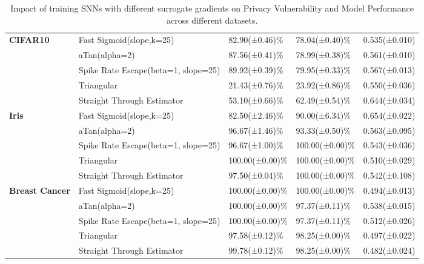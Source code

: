 \begin{table*}[htbp]
\begin{tabular}{p{2cm} p{4cm} p{1.5cm} p{1.5cm} p{1.5cm}}
\midrule
\textbf{CIFAR10} & Fast Sigmoid(slope,k=25) & 82.90(±0.46)\% & 78.04(±0.40)\% & 0.535(±0.010) \\
 & aTan(alpha=2) & 87.56(±0.41)\% & 78.99(±0.38)\% & 0.561(±0.010) \\
 & Spike Rate Escape(beta=1, slope=25) & 89.92(±0.39)\% & 79.95(±0.33)\% & 0.567(±0.013) \\
 & Triangular & 21.43(±0.76)\% & 23.92(±0.86)\% & 0.550(±0.036) \\
 & Straight Through Estimator & 53.10(±0.66)\% & 62.49(±0.54)\% & 0.644(±0.034) \\
\midrule
\textbf{Iris} & Fast Sigmoid(slope,k=25) & 82.50(±2.46)\% & 90.00(±6.34)\% & 0.654(±0.022) \\ 
 & aTan(alpha=2) & 96.67(±1.46)\% & 93.33(±0.50)\% & 0.563(±0.095) \\
 & Spike Rate Escape(beta=1, slope=25) & 96.67(±1.00)\% & 100.00(±0.00)\% & 0.543(±0.036) \\
 & Triangular & 100.00(±0.00)\% & 100.00(±0.00)\% & 0.510(±0.029) \\
 & Straight Through Estimator & 97.50(±0.04)\% & 100.00(±0.00)\% & 0.542(±0.108) \\
\midrule
\textbf{Breast Cancer} & Fast Sigmoid(slope,k=25) & 100.00(±0.00)\% & 100.00(±0.00)\% & 0.494(±0.013) \\
 & aTan(alpha=2) & 100.00(±0.00)\% & 97.37(±0.11)\% & 0.538(±0.015) \\
 & Spike Rate Escape(beta=1, slope=25) & 100.00(±0.00)\% & 97.37(±0.11)\% & 0.512(±0.026) \\
 & Triangular & 97.58(±0.12)\% & 98.25(±0.00)\% & 0.497(±0.022) \\
 & Straight Through Estimator & 99.78(±0.12)\% & 98.25(±0.00)\% & 0.482(±0.024) \\
\bottomrule
\end{tabular}
\caption{Impact of training SNNs with different surrogate gradients on Privacy Vulnerability and Model Performance across different datasets.}
\label{table:sg}
\end{table*}


